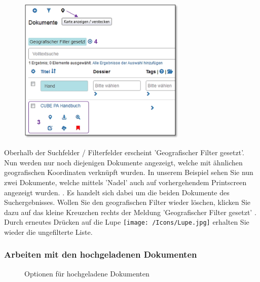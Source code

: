 \begin{figure}
  \vspace{-25pt} 
  \begin{center}
    \includegraphics[height=70mm]{../chapters/11_Dokumentenablage/pictures/11-2-3_GeoBereichResult.jpg}
  \end{center}
  \vspace{-20pt}
  \vspace{-10pt}
\end{figure}
Oberhalb der Suchfelder / Filterfelder erscheint 'Geografischer Filter gesetzt'. Nun werden nur noch diejenigen Dokumente angezeigt, welche mit ähnlichen geografischen Koordinaten verknüpft wurden. In unserem Beispiel sehen Sie nun zwei Dokumente, welche mittels 'Nadel' auch auf vorhergehendem Printscreen angezeigt wurden. . Es handelt sich dabei um die beiden Dokumente des Suchergebnisses. Wollen Sie den geografischen Filter wieder löschen, klicken Sie dazu auf das kleine Kreuzchen rechts der Meldung 'Geografischer Filter gesetzt' . Durch erneutes Drücken auf die Lupe \texttt{[image: /Icons/Lupe.jpg]} erhalten Sie wieder die ungefilterte Liste.

\subsubsection{Arbeiten mit den hochgeladenen Dokumenten}
\label{bkm:Ref442801819}

\begin{figure}[H]
\caption{Optionen für hochgeladene Dokumenten}
\end{figure}

